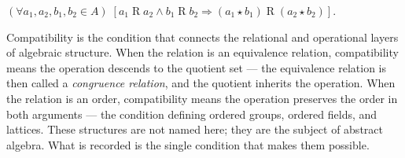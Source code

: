 \begin{remark}
$(\forall a_1, a_2, b_1, b_2 \in A)\;
[a_1 \mathrel{R} a_2 \land b_1 \mathrel{R} b_2
\Rightarrow (a_1 \star b_1) \mathrel{R} (a_2 \star b_2)]$.
\end{remark}

\begin{remark}
Compatibility is the condition that connects the relational and operational
layers of algebraic structure.
When the relation is an equivalence relation, compatibility means the
operation descends to the quotient set — the equivalence relation is then
called a \emph{congruence relation}, and the quotient inherits the operation.
When the relation is an order, compatibility means the operation preserves
the order in both arguments — the condition defining ordered groups,
ordered fields, and lattices.
These structures are not named here; they are the subject of abstract algebra.
What is recorded is the single condition that makes them possible.
\end{remark}
